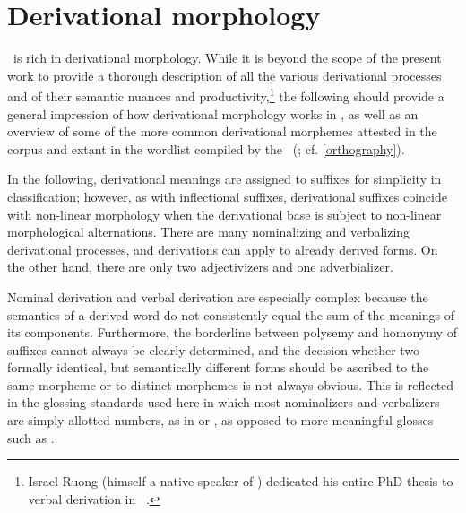 \tableofcontents\clearpage



\chapter{Derivational morphology}\label{derivMorph}
\PS\ is rich in derivational morphology. While it is beyond the scope of the present work to provide a thorough description of all the various derivational processes and of their semantic nuances and productivity,\footnote{Israel Ruong (himself a native speaker of \PS) dedicated his entire PhD thesis to verbal derivation in \PS\ \citep{Ruong1943}.} %
the following should provide a general impression of how derivational morphology works in \PS, as well as an overview of some of the more common derivational morphemes attested in the corpus and extant in the wordlist compiled by the \WLP\ (\cite{insamlingPS2011}; cf. \SEC\ref{orthography}). 

In the following, derivational meanings are assigned to suffixes for simplicity in classification; however, as with inflectional suffixes, derivational suffixes coincide with non-linear morphology when the derivational base is subject to non-linear morphological alternations. %
There are many nominalizing and verbalizing derivational processes, and derivations can apply to already derived forms. 
On the other hand, there are only two adjectivizers and one adverbializer. 

Nominal derivation and verbal derivation are especially complex because the semantics of a derived word do not consistently equal the sum of the meanings of its components. Furthermore, the borderline between polysemy and homonymy of suffixes cannot always be clearly determined, and the decision whether two formally identical, but semantically different forms should be ascribed to the same morpheme or to distinct morphemes is not always obvious. 
This is reflected in the glossing standards used here in which most nominalizers and verbalizers are simply allotted numbers, as in  or , as opposed to more meaningful glosses such as . 

